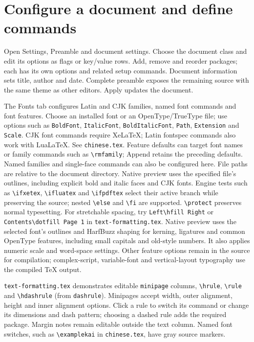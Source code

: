 \documentclass[11pt]{article}
\begin{document}
\section{Configure a document and define commands}
Open Settings, Preamble and document settings. Choose the document class and
edit its options as flags or key/value rows. Add, remove and reorder packages;
each has its own options and related setup commands. Document information sets
title, author and date. Complete preamble exposes the remaining source with the
same theme as other editors. Apply updates the document.

The Fonts tab configures Latin and CJK families, named font commands and font
features. Choose an installed font or an OpenType/TrueType file; use options such
as \texttt{BoldFont}, \texttt{ItalicFont}, \texttt{BoldItalicFont}, \texttt{Path},
\texttt{Extension} and \texttt{Scale}. CJK font commands require Xe\LaTeX;
Latin fontspec commands also work with Lua\LaTeX. See \texttt{chinese.tex}.
Feature defaults can target font names or family commands such as
\verb|\rmfamily|; Append retains the preceding defaults. Named families and
single-face commands can also be configured here.
File paths are relative to the document directory. Native preview uses the
specified file's outlines, including explicit bold and italic faces and CJK fonts.
Engine tests such as \verb|\ifxetex|, \verb|\ifluatex| and \verb|\ifpdftex|
select their active branch while preserving the source; nested \verb|\else|
and \verb|\fi| are supported. \verb|\protect| preserves normal typesetting.
For stretchable spacing, try \verb|Left\hfill Right| or
\verb|Contents\dotfill Page 1| in \texttt{text-formatting.tex}.
Native preview uses the selected font's outlines and HarfBuzz shaping for
kerning, ligatures and common OpenType features, including small capitals and
old-style numbers. It also applies numeric scale and word-space settings.
Other feature options remain in the source for compilation; complex-script,
variable-font and vertical-layout typography use the compiled \TeX{} output.

\texttt{text-formatting.tex} demonstrates editable \texttt{minipage} columns,
\verb|\hrule|, \verb|\rule| and \verb|\hdashrule| (from \texttt{dashrule}).
Minipages accept width, outer alignment, height and inner alignment options.
Click a rule to switch its command or change its dimensions and dash pattern;
choosing a dashed rule adds the required package.
Margin notes remain editable outside the text column. Named font switches,
such as \verb|\examplekai| in \texttt{chinese.tex}, have gray source markers.
\end{document}
